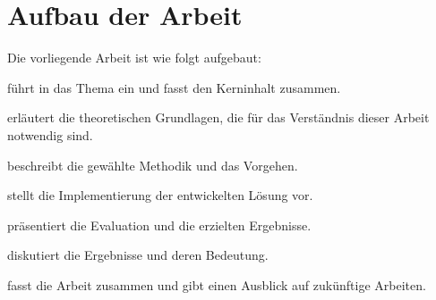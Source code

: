 \clearpage
\section{Aufbau der Arbeit}
\label{sec:aufbau}

Die vorliegende Arbeit ist wie folgt aufgebaut:

\textbf{} führt in das Thema ein und fasst den Kerninhalt zusammen. 

\textbf{} erläutert die theoretischen Grundlagen, die für das Verständnis dieser Arbeit notwendig sind.

\textbf{} beschreibt die gewählte Methodik und das Vorgehen.

\textbf{} stellt die Implementierung der entwickelten Lösung vor.

\textbf{} präsentiert die Evaluation und die erzielten Ergebnisse.

\textbf{} diskutiert die Ergebnisse und deren Bedeutung.

\textbf{} fasst die Arbeit zusammen und gibt einen Ausblick auf zukünftige Arbeiten.
